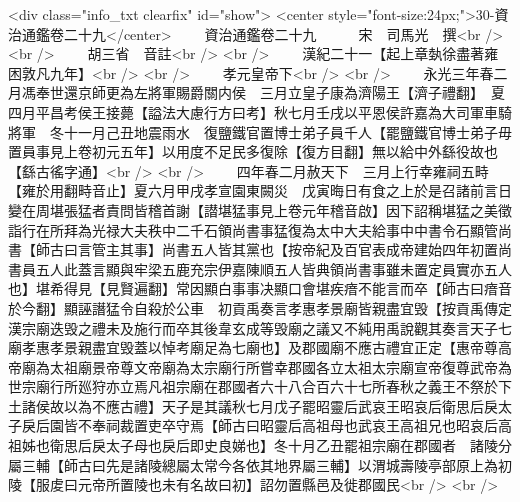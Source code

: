 <div class="info_txt clearfix" id="show">
<center style="font-size:24px;">30-資治通鑑卷二十九</center>
  　　資治通鑑卷二十九　　　宋　司馬光　撰<br />
<br />
　　胡三省　音註<br />
<br />
　　漢紀二十一【起上章埶徐盡著雍困敦凡九年】<br />
<br />
　　孝元皇帝下<br />
<br />
　　永光三年春二月馮奉世還京師更為左將軍賜爵關内侯　三月立皇子康為濟陽王【濟子禮翻】　夏四月平昌考侯王接薨【謚法大慮行方曰考】秋七月壬戌以平恩侯許嘉為大司軍車騎將軍　冬十一月己丑地震雨水　復鹽鐵官置博士弟子員千人【罷鹽鐵官博士弟子毋置員事見上卷初元五年】以用度不足民多復除【復方目翻】無以給中外繇役故也【繇古徭字通】<br />
<br />
　　四年春二月赦天下　三月上行幸雍祠五畤【雍於用翻畤音止】夏六月甲戌孝宣園東闕災　戊寅晦日有食之上於是召諸前言日變在周堪張猛者責問皆稽首謝【譛堪猛事見上卷元年稽音啟】因下詔稱堪猛之美徵詣行在所拜為光禄大夫秩中二千石領尚書事猛復為太中大夫給事中中書令石顯管尚書【師古曰言管主其事】尚書五人皆其黨也【按帝紀及百官表成帝建始四年初置尚書員五人此蓋言顯與牢梁五鹿充宗伊嘉陳順五人皆典領尚書事雖未置定員實亦五人也】堪希得見【見賢遍翻】常因顯白事事决顯口會堪疾瘖不能言而卒【師古曰瘖音於今翻】顯誣譖猛令自殺於公車　初貢禹奏言孝惠孝景廟皆親盡宜毁【按貢禹傳定漢宗廟迭毁之禮未及施行而卒其後韋玄成等毁廟之議又不純用禹說觀其奏言天子七廟孝惠孝景親盡宜毁蓋以悼考廟足為七廟也】及郡國廟不應古禮宜正定【惠帝尊高帝廟為太祖廟景帝尊文帝廟為太宗廟行所嘗幸郡國各立太祖太宗廟宣帝復尊武帝為世宗廟行所廵狩亦立焉凡祖宗廟在郡國者六十八合百六十七所春秋之義王不祭於下土諸侯故以為不應古禮】天子是其議秋七月戊子罷昭靈后武哀王昭哀后衛思后戾太子戾后園皆不奉祠裁置吏卒守焉【師古曰昭靈后高祖母也武哀王高祖兄也昭哀后高祖姊也衛思后戾太子母也戾后即史良娣也】冬十月乙丑罷祖宗廟在郡國者　諸陵分屬三輔【師古曰先是諸陵總屬太常今各依其地界屬三輔】以渭城壽陵亭部原上為初陵【服䖍曰元帝所置陵也未有名故曰初】詔勿置縣邑及徙郡國民<br />
<br />
